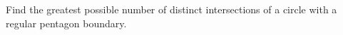 Find the greatest possible number of distinct intersections of a circle with a regular pentagon boundary.
